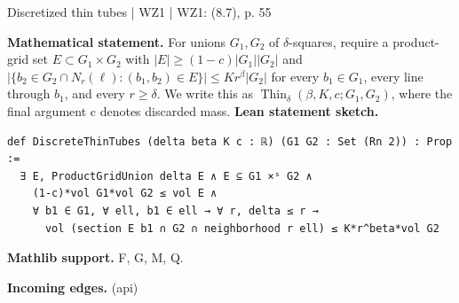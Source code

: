 \documentclass[10pt,a4paper]{article}
\newcommand{\nodecard}[1]{\hyperlink{node-#1}{\texttt{\detokenize{#1}}}}
\begin{document}
\begin{minipage}{\linewidth}
\hypertarget{node-DthinD}{}
\begin{tcolorbox}[colback=white,colframe=radialfg,colbacktitle=radialbg,coltitle=ink,boxrule=0.45pt,arc=1.6mm,left=3mm,right=3mm,top=2mm,bottom=2mm,title={\sffamily\bfseries WZ1 Definition 8.5' \hfill \texttt{DthinD}}]
{\sffamily\small\color{muted}Discretized thin tubes | WZ1 | WZ1: (8.7), p. 55}\par
\textbf{Mathematical statement.} For unions $G_1,G_2$ of $\delta$-squares, require a product-grid set $E\subset G_1\times G_2$ with $|E|\ge(1-c)|G_1||G_2|$ and
$|\{b_2\in G_2\cap N_r(\ell):(b_1,b_2)\in E\}|\le Kr^\beta|G_2|$
for every $b_1\in G_1$, every line through $b_1$, and every $r\ge\delta$.
We write this as $\operatorname{Thin}_\delta(\beta,K,c;G_1,G_2)$, where the final argument c denotes discarded mass.
\smallskip\textbf{Lean statement sketch.}
\begin{Verbatim}[fontsize=\small,breaklines=true,breakanywhere=true,tabsize=2]
def DiscreteThinTubes (delta beta K c : ℝ) (G1 G2 : Set (Rn 2)) : Prop :=
  ∃ E, ProductGridUnion delta E ∧ E ⊆ G1 ×ˢ G2 ∧
    (1-c)*vol G1*vol G2 ≤ vol E ∧
    ∀ b1 ∈ G1, ∀ ell, b1 ∈ ell → ∀ r, delta ≤ r →
      vol (section E b1 ∩ G2 ∩ neighborhood r ell) ≤ K*r^beta*vol G2
\end{Verbatim}
{\footnotesize\textbf{Mathlib support.} F, G, M, Q.\par
\textbf{Incoming edges.} \nodecard{Dthin} (api)\par}

\end{tcolorbox}\end{minipage}\par\medskip
\end{document}
